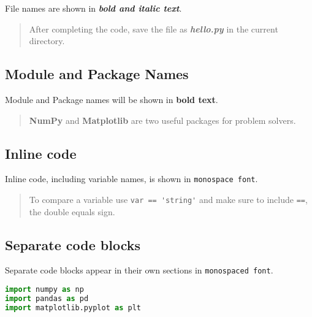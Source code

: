 \documentclass{book}
\newcommand{\passthrough}[1]{#1}
\begin{document}
File names are shown in \textbf{\emph{bold and italic text}}.

\begin{quote}
After completing the code, save the file as \textbf{\emph{hello.py}} in
the current directory.
\end{quote}
    




    
        \hypertarget{module-and-package-names}{%
\subsection{Module and Package Names}\label{module-and-package-names}}

Module and Package names will be shown in \textbf{bold text}.

\begin{quote}
\textbf{NumPy} and \textbf{Matplotlib} are two useful packages for
problem solvers.
\end{quote}
    




    
        \hypertarget{inline-code}{%
\subsection{Inline code}\label{inline-code}}

Inline code, including variable names, is shown in
\passthrough{\lstinline!monospace font!}.

\begin{quote}
To compare a variable use \passthrough{\lstinline!var == 'string'!} and
make sure to include \passthrough{\lstinline!==!}, the double equals
sign.
\end{quote}
    




    
        \hypertarget{separate-code-blocks}{%
\subsection{Separate code blocks}\label{separate-code-blocks}}

Separate code blocks appear in their own sections in
\passthrough{\lstinline!monospaced font!}.

\begin{lstlisting}[language=Python]
import numpy as np
import pandas as pd
import matplotlib.pyplot as plt
\end{lstlisting}
    
\end{document}
